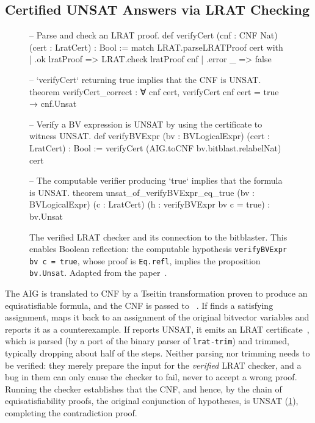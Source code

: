 \subsection{Certified UNSAT Answers via LRAT Checking}
\label{sec:bg:bvdecide-sat}

\begin{figure}
\begin{leanfootnotesize}
-- Parse and check an LRAT proof.
def verifyCert (cnf : CNF Nat) (cert : LratCert) : Bool :=
  match LRAT.parseLRATProof cert with
  | .ok lratProof => LRAT.check lratProof cnf
  | .error _ => false

-- `verifyCert` returning true implies that the CNF is UNSAT.
theorem verifyCert_correct : ∀ cnf cert, verifyCert cnf cert = true → cnf.Unsat

-- Verify a BV expression is UNSAT by using the certificate to witness UNSAT.
def verifyBVExpr (bv : BVLogicalExpr) (cert : LratCert) : Bool :=
  verifyCert (AIG.toCNF bv.bitblast.relabelNat) cert

-- The computable verifier producing `true` implies that the formula is UNSAT.
theorem unsat_of_verifyBVExpr_eq_true (bv : BVLogicalExpr) (c : LratCert)
    (h : verifyBVExpr bv c = true) : bv.Unsat
\end{leanfootnotesize}
\caption{The verified LRAT checker and its connection to the bitblaster. This
enables Boolean reflection: the computable hypothesis
\texttt{verifyBVExpr bv c = true}, whose proof is \texttt{Eq.refl}, implies
the proposition \texttt{bv.Unsat}. Adapted from the \bvdecide{}
paper~\citep{leanbv}.}
\label{fig:bg:unsat-cert-check}
\end{figure}

The AIG is translated to CNF by a Tseitin transformation proven to produce an
equisatisfiable formula, and the CNF is passed to
\cadical{}~\citep{biere2024cadical}. If \cadical{} finds a satisfying
assignment, \bvdecide{} maps it back to an assignment of the original
bitvector variables and reports it as a counterexample. If \cadical{} reports
UNSAT, it emits an LRAT certificate~\citep{cruz2017efficient}, which is parsed
(by a port of the binary parser of \texttt{lrat-trim}) and trimmed, typically
dropping about half of the steps. Neither parsing nor trimming needs to be
verified: they merely prepare the input for the \emph{verified} LRAT checker,
and a bug in them can only cause the checker to fail, never to accept a wrong
proof. Running the checker establishes that the CNF, and hence, by the chain
of equisatisfiability proofs, the original conjunction of hypotheses, is
UNSAT (\cref{fig:bg:unsat-cert-check}), completing the contradiction proof.


